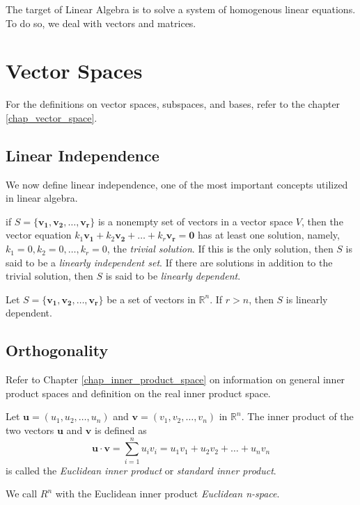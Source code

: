 \documentclass{report}
\begin{document}
The target of Linear Algebra is to solve a system of homogenous linear equations. To do so, we deal with vectors and matrices.
	\section{Vector Spaces}
		For the definitions on vector spaces, subspaces, and bases, refer to the chapter \ref{chap_vector_space}.
		\subsection{Linear Independence}
		We now define linear independence, one of the most important concepts utilized in linear algebra.
		\begin{defn}
			if $S=\{\bm{v_1}, \bm{v_2}, \dots, \bm{v_r}\}$ is a nonempty set of vectors in a vector space $V$, then the vector equation $k_1\bm{v_1}+k_2\bm{v_2}+\dots+k_r\bm{v_r}=\bm{0}$ has at least one solution, namely, $k_1=0, k_2=0, \dots, k_r=0$, the \emph{trivial solution}. If this is the only solution, then $S$ is said to be a \emph{linearly independent set}. If there are solutions in addition to the trivial solution, then $S$ is said to be \emph{linearly dependent}.
		\end{defn}
		
		\begin{thm}
			Let $S=\{\bm{v_1}, \bm{v_2}, \dots, \bm{v_r}\}$ be a set of vectors in $\mathbb{R}^n$. If $r>n$, then $S$ is linearly dependent.
		\end{thm}
		
		\subsection{Orthogonality}
		Refer to Chapter \ref{chap_inner_product_space} on information on general inner product spaces and definition on the real inner product space.
		\begin{defn}
			Let $\bm{u}=(u_1,u_2,\dots,u_n)$ and $\bm{v}=(v_1,v_2,\dots,v_n)$ in $\mathbb{R}^n$. The inner product of the two vectors $\bm{u}$ and $\bm{v}$ is defined as
			\begin{displaymath}
				\bm{u}\cdot\bm{v}=\sum_{i=1}^{n}u_iv_i=u_1v_1+u_2v_2+\dots+u_nv_n
			\end{displaymath}
			is called the \emph{Euclidean inner product} or \emph{standard inner product}.
		\end{defn}
		
		We call $R^n$ with the Euclidean inner product \emph{Euclidean n-space}.
		
\end{document}
